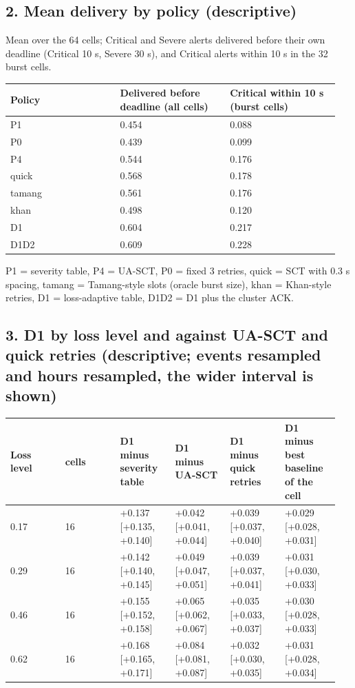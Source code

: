 \subsection*{2. Mean delivery by policy (descriptive)}

Mean over the 64 cells; Critical and Severe alerts delivered before their own deadline (Critical 10 s, Severe 30 s), and Critical alerts within 10 s in the 32 burst cells.

{\scriptsize\raggedright
\begin{longtable}{p{0.317\linewidth}p{0.317\linewidth}p{0.317\linewidth}}
\toprule
Policy & Delivered before deadline (all cells) & Critical within 10 s (burst cells) \\
\midrule
\endhead
P1 & 0.454 & 0.088 \\
P0 & 0.439 & 0.099 \\
P4 & 0.544 & 0.176 \\
quick & 0.568 & 0.178 \\
tamang & 0.561 & 0.176 \\
khan & 0.498 & 0.120 \\
D1 & 0.604 & 0.217 \\
D1D2 & 0.609 & 0.228 \\
\bottomrule
\end{longtable}}

P1 = severity table, P4 = UA-SCT, P0 = fixed 3 retries, quick = SCT with 0.3 s spacing, tamang = Tamang-style slots (oracle burst size), khan = Khan-style retries, D1 = loss-adaptive table, D1D2 = D1 plus the cluster ACK.

\subsection*{3. D1 by loss level and against UA-SCT and quick retries (descriptive; events resampled and hours resampled, the wider interval is shown)}

{\scriptsize\raggedright
\begin{longtable}{p{0.158\linewidth}p{0.158\linewidth}p{0.158\linewidth}p{0.158\linewidth}p{0.158\linewidth}p{0.158\linewidth}}
\toprule
Loss level & cells & D1 minus severity table & D1 minus UA-SCT & D1 minus quick retries & D1 minus best baseline of the cell \\
\midrule
\endhead
0.17 & 16 & +0.137 [+0.135, +0.140] & +0.042 [+0.041, +0.044] & +0.039 [+0.037, +0.040] & +0.029 [+0.028, +0.031] \\
0.29 & 16 & +0.142 [+0.140, +0.145] & +0.049 [+0.047, +0.051] & +0.039 [+0.037, +0.041] & +0.031 [+0.030, +0.033] \\
0.46 & 16 & +0.155 [+0.152, +0.158] & +0.065 [+0.062, +0.067] & +0.035 [+0.033, +0.037] & +0.030 [+0.028, +0.033] \\
0.62 & 16 & +0.168 [+0.165, +0.171] & +0.084 [+0.081, +0.087] & +0.032 [+0.030, +0.035] & +0.031 [+0.028, +0.034] \\
\bottomrule
\end{longtable}}

